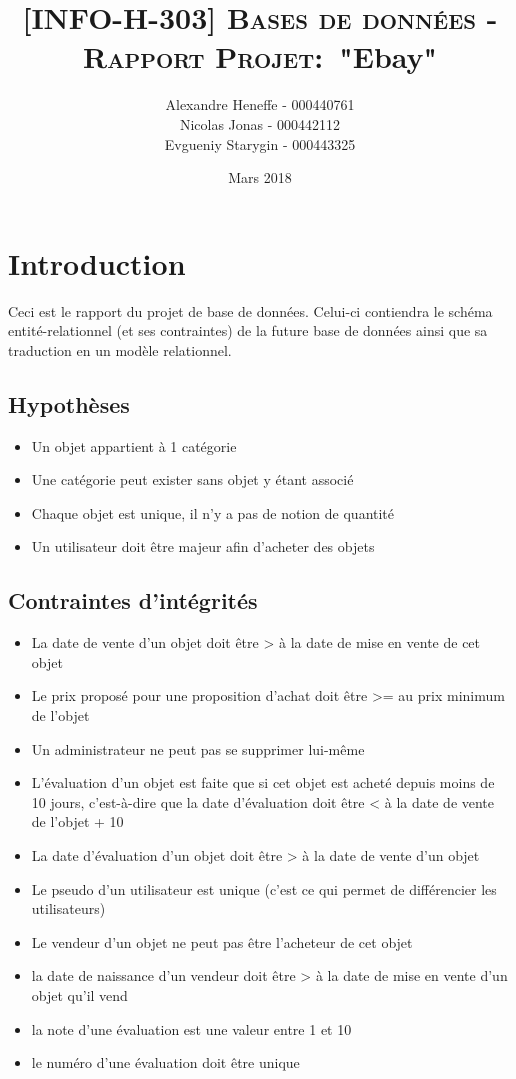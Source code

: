 \documentclass[a4paper,11pt]{article}
\title{\textsc{[INFO-H-303] Bases de données - Rapport Projet:}\
   "Ebay"}
\author{Alexandre Heneffe - 000440761\\
        Nicolas Jonas - 000442112\\
        Evgueniy Starygin - 000443325}
\date{Mars 2018}
\begin{document}
\maketitle
\section{Introduction}

Ceci est le rapport du projet de base de données. Celui-ci contiendra le schéma entité-relationnel (et ses contraintes) de la future base de données ainsi que sa traduction en un modèle relationnel.

\subsection{Hypothèses}

\begin{itemize}[label=\textbullet]
	\item Un objet appartient à 1 catégorie
	\item Une catégorie peut exister sans objet y étant associé
	\item Chaque objet est unique, il n'y a pas de notion de quantité
	\item Un utilisateur doit être majeur afin d'acheter des objets

\end{itemize}

\subsection{Contraintes d'intégrités}

\begin{itemize} [label=\textbullet]
	\item La date de vente d'un objet doit être > à la date de mise en vente de cet objet
	\item Le prix proposé pour une proposition d'achat doit être >= au prix minimum de l'objet
	\item Un administrateur ne peut pas se supprimer lui-même
	\item L'évaluation d'un objet est faite que si cet objet est acheté depuis moins de 10 jours, c'est-à-dire que la date d'évaluation doit être < à
	la date de vente de l'objet + 10
	\item La date d'évaluation d'un objet doit être > à la date de vente d'un objet
	\item Le pseudo d'un utilisateur est unique (c'est ce qui permet de différencier les utilisateurs)
	\item Le vendeur d'un objet ne peut pas être l'acheteur de cet objet
	\item la date de naissance d'un vendeur doit être > à la date de mise en vente d'un objet qu'il vend
	\item la note d'une évaluation est une valeur entre 1 et 10
	\item le numéro d'une évaluation doit être unique
	
\end{itemize}
\end{document}
